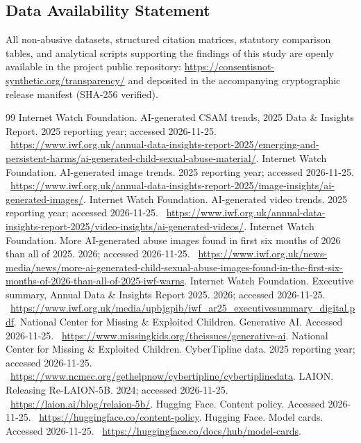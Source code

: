 \documentclass[10pt,a4paper]{article}
\begin{document}
\subsection{Data Availability Statement}
All non-abusive datasets, structured citation matrices, statutory comparison tables, and analytical scripts supporting the findings of this study are openly available in the project public repository: \url{https://consentisnot-synthetic.org/transparency/} and deposited in the accompanying cryptographic release manifest (SHA-256 verified).

\begin{thebibliography}{99}\footnotesize\setlength{\itemsep}{0pt}\setlength{\parskip}{0pt}
 Internet Watch Foundation. AI-generated CSAM trends, 2025 Data \& Insights Report. 2025 reporting year; accessed 2026-11-25. \ \url{https://www.iwf.org.uk/annual-data-insights-report-2025/emerging-and-persistent-harms/ai-generated-child-sexual-abuse-material/}.
 Internet Watch Foundation. AI-generated image trends. 2025 reporting year; accessed 2026-11-25. \ \url{https://www.iwf.org.uk/annual-data-insights-report-2025/image-insights/ai-generated-images/}.
 Internet Watch Foundation. AI-generated video trends. 2025 reporting year; accessed 2026-11-25. \ \url{https://www.iwf.org.uk/annual-data-insights-report-2025/video-insights/ai-generated-videos/}.
 Internet Watch Foundation. More AI-generated abuse images found in first six months of 2026 than all of 2025. 2026; accessed 2026-11-25. \ \url{https://www.iwf.org.uk/news-media/news/more-ai-generated-child-sexual-abuse-images-found-in-the-first-six-months-of-2026-than-all-of-2025-iwf-warns}.
 Internet Watch Foundation. Executive summary, Annual Data \& Insights Report 2025. 2026; accessed 2026-11-25. \ \url{https://www.iwf.org.uk/media/upbjgpib/iwf_ar25_executivesummary_digital.pdf}.
 National Center for Missing \& Exploited Children. Generative AI. Accessed 2026-11-25. \ \url{https://www.missingkids.org/theissues/generative-ai}.
 National Center for Missing \& Exploited Children. CyberTipline data. 2025 reporting year; accessed 2026-11-25. \ \url{https://www.ncmec.org/gethelpnow/cybertipline/cybertiplinedata}.
 LAION. Releasing Re-LAION-5B. 2024; accessed 2026-11-25. \ \url{https://laion.ai/blog/relaion-5b/}.
 Hugging Face. Content policy. Accessed 2026-11-25. \ \url{https://huggingface.co/content-policy}.
 Hugging Face. Model cards. Accessed 2026-11-25. \ \url{https://huggingface.co/docs/hub/model-cards}.

\end{thebibliography}
\end{document}
